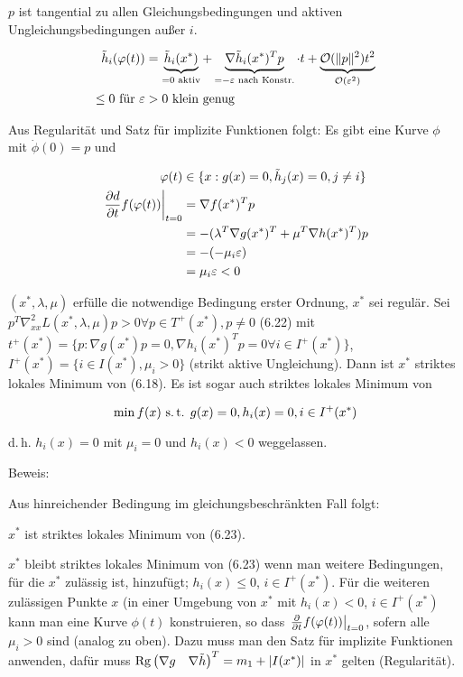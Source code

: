 $p$ ist tangential zu allen Gleichungsbedingungen und aktiven Ungleichungsbedingungen außer $i$.

\begin{align*}
\tilde h_i(\varphi(t)) &= \underbrace{\tilde h_i(x^*)}_{=0 \text{ aktiv}} + \underbrace{\nabla \tilde h_i (x^*)^T p}_{=-\varepsilon \text{ nach Konstr.}} \cdot t + \underbrace{\mathcal O(\|p\|^2) t^2}_{\mathcal O(\varepsilon^2)} \\
\leq 0 \text{ für } \varepsilon &> 0 \text{ klein genug}
\end{align*}

Aus Regularität und Satz für implizite Funktionen folgt: Es gibt eine Kurve $\phi$ mit $\dot \phi(0) = p$ und 

\begin{align*}
\varphi(t) &\in \{ x : g(x)=0, \tilde h_j(x) = 0, j\neq i \} \\
\left. \frac{\partial d}{\partial t} f(\varphi(t))\right|_{t=0} &= \nabla f(x^*)^T p\\
&= - ( \lambda^T \nabla g(x^*)^T + \mu^T \nabla h(x^*)^T)p \\
&= - (-\mu_i \varepsilon) \\
&= \mu_i\varepsilon < 0
\end{align*}


$(x^*, \lambda, \mu)$ erfülle die notwendige Bedingung erster Ordnung, $x^*$ sei regulär. Sei $p^T \nabla_{xx}^2 L(x^*, \lambda, \mu) p > 0 \forall p \in T^+(x^*), p\neq 0$ (6.22) mit $t^+(x^*) = \{ p: \nabla g(x^*) p = 0, \nabla h_i(x^*)^T p = 0 \forall i \in I^+(x^*) \}$, $I^+(x^*) = \{ i \in I(x^*), \mu_i > 0 \}$ (strikt aktive Ungleichung). Dann ist $x^*$ striktes lokales Minimum von (6.18). Es ist sogar auch striktes lokales Minimum von

\[ \min f(x) \text{ s.\,t. } g(x)=0, h_i(x) = 0, i \in I^+(x^*) \]

d.\,h. $h_i(x) = 0$ mit $\mu_i = 0$ und $h_i(x) < 0$ weggelassen.

Beweis:

Aus hinreichender Bedingung im gleichungsbeschränkten Fall folgt:

\bitm
\item $x^*$ ist striktes lokales Minimum von (6.23).
\item $x^*$ bleibt striktes lokales Minimum von (6.23) wenn man weitere Bedingungen, für die $x^*$ zulässig ist, hinzufügt; $h_i(x) \leq 0$, $i \in I^+(x^*)$. Für die weiteren zulässigen Punkte $x$ (in einer Umgebung von $x^*$ mit $h_i(x) < 0$, $i \in I^+(x^*)$ kann man eine Kurve $\phi(t)$ konstruieren, so dass $\left. \frac{\partial}{\partial t} f(\varphi(t))\right|_{t=0}$, sofern alle $\mu_i > 0$ sind (analog zu oben). Dazu muss man den Satz für implizite Funktionen anwenden, dafür muss $\mathrm{Rg} \begin{pmatrix} \nabla g & \nabla \tilde h \end{pmatrix}^T = m_1 + |I(x^*)|$ in $x^*$ gelten (Regularität).
\eitm

